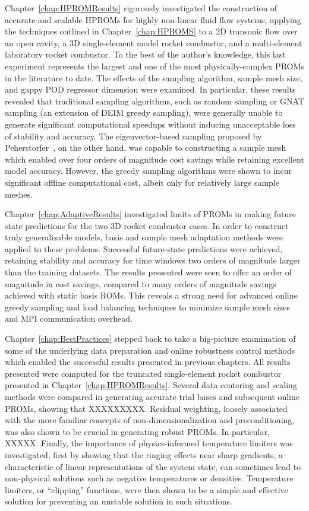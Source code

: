 Chapter~\ref{chap:HPROMResults} rigorously investigated the construction of accurate and scalable HPROMs for highly non-linear fluid flow systems, applying the techniques outlined in Chapter~\ref{chap:HPROMS} to a 2D transonic flow over an open cavity, a 3D single-element model rocket combustor, and a multi-element laboratory rocket combustor. To the best of the author's knowledge, this last experiment represents the largest and one of the most physically-complex PROMs in the literature to date. The effects of the sampling algorithm, sample mesh size, and gappy POD regressor dimension were examined. In particular, these results revealed that traditional sampling algorithms, such as random sampling or GNAT sampling (an extension of DEIM greedy sampling), were generally unable to generate significant computational speedups without inducing unacceptable loss of stability and accuracy. The eigenvector-based sampling proposed by Peherstorfer~\cite{Peherstorfer2020}, on the other hand, was capable to constructing a sample mesh which enabled over four orders of magnitude cost savings while retaining excellent model accuracy. However, the greedy sampling algorithms were shown to incur significant offline computational cost, albeit only for relatively large sample meshes.

Chapter~\ref{chap:AdaptiveResults} investigated limits of PROMs in making future state predictions for the two 3D rocket combustor cases. In order to construct truly generalizable models, basis and sample mesh adaptation methods were applied to these problems. Successful future-state predictions were achieved, retaining stability and accuracy for time windows two orders of magnitude  larger than the training datasets. The results presented were seen to offer an order of magnitude in cost savings, compared to many orders of magnitude savings achieved with static basis ROMs. This reveals a strong need for advanced online greedy sampling and load balancing techniques to minimize sample mesh sizes and MPI communication overhead.

Chapter~\ref{chap:BestPractices} stepped back to take a big-picture examination of some of the underlying data preparation and online robustness control methods which enabled the successful results presented in previous chapters. All results presented were computed for the truncated single-element rocket combustor presented in Chapter~\ref{chap:HPROMResults}. Several data centering and scaling methods were compared in generating accurate trial bases and subsequent online PROMs, showing that {\color{red}XXXXXXXXX}. Residual weighting, loosely associated with the more familiar concepts of non-dimensionalization and preconditioning, was also shown to be crucial in generating robust PROMs. In particular, {\color{red}XXXXX}. Finally, the importance of physics-informed temperature limiters was investigated, first by showing that the ringing effects near sharp gradients, a characteristic of linear representations of the system state, can sometimes lead to non-physical solutions such as negative temperatures or densities. Temperature limiters, or ``clipping'' functions, were then shown to be a simple and effective solution for preventing an unstable solution in such situations.

